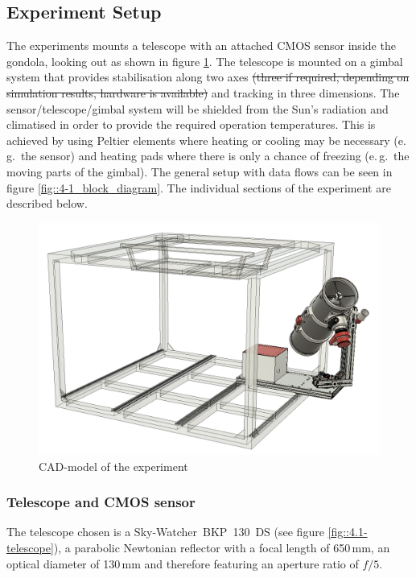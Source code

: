 \subsection{Experiment Setup} \label{Experiment_Setup}




The experiments mounts a telescope with an attached CMOS sensor inside the gondola, looking out as shown in figure \ref{fig::4-1_CAD}. The telescope is mounted on a gimbal system that provides stabilisation along two axes \st{(three if required, depending on simulation results, hardware is available)} and tracking in three dimensions. The sensor/telescope/gimbal system will be shielded from the Sun's radiation and climatised in order to provide the required operation temperatures. This is achieved by using Peltier elements where heating or cooling may be necessary (e.\,g.~the sensor) and heating pads where there is only a chance of freezing (e.\,g.~the moving parts of the gimbal). The general setup with data flows can be seen in figure \ref{fig::4-1_block_diagram}. The individual sections of the experiment are described below.

\begin{figure}[h]
	\centering
	\includegraphics[width=0.7\linewidth]{4-experiment-design/img/mechanical/iso0.png}
	\caption{CAD-model of the experiment}
	\label{fig::4-1_CAD}
\end{figure}


\subsubsection{Telescope and CMOS sensor}
The telescope chosen is a Sky-Watcher~BKP~130~DS (see figure \ref{fig::4.1-telescope}), a parabolic Newtonian reflector with a focal length of 650\,mm, an optical diameter of 130\,mm and therefore featuring an aperture ratio of $f/5$. 


